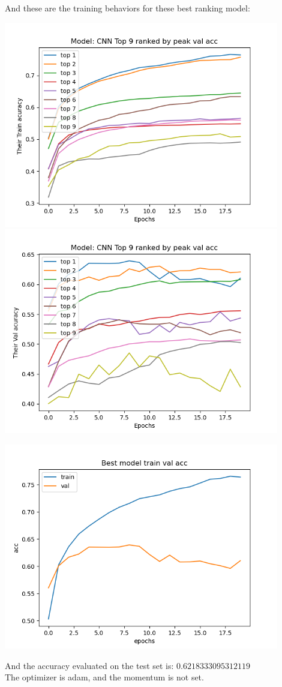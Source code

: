 \documentclass[]{article}
\begin{document}
        And these are the training behaviors for these best ranking model: 
        \begin{center}
            \includegraphics[width=12cm]{a6plots/20-47-34-May-22-2021-CNN-train-acc.png}
            \includegraphics[width=12cm]{a6plots/20-47-34-May-22-2021-CNN-val-acc.png}
        \end{center}
        \begin{center}
            \includegraphics[width=12cm]{a6plots/20-47-34-May-22-2021-CNN-best-acc.png}
        \end{center}
        And the accuracy evaluated on the test set is: $0.6218333095312119$
        \\
        The optimizer is adam, and the momentum is not set. 
\end{document}
